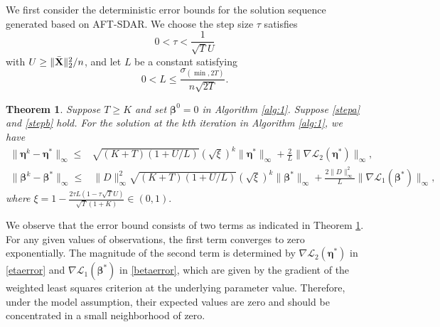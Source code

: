 \documentclass[12pt]{article}
\newtheorem{theorem}{Theorem}
\newcommand{\bX}{{\bf X}}
\newcommand{\bbeta}{\boldsymbol{\beta}}
\newcommand{\boldeta}{\boldsymbol{\eta}}
\begin{document}
We first consider the deterministic error bounds for the solution sequence generated
based on AFT-SDAR.
{ We choose  the step size $\tau$ satisfies}
 \begin{equation}
 \label{stepa}
 0 < \tau<\frac{1}{ \sqrt{T}U}
 \end{equation}
with $ U \ge {\|\bar{\bX}\|_2^2}/{n}$, and let $L$ be a constant satisfying
\begin{equation}
\label{stepb}
0<L\leq\frac{\sigma_{(\min,2T)}}{n\sqrt{2T}}.
\end{equation}
\begin{theorem}\label{th1}
Suppose $T \ge K$ and set $\bbeta^0=0$ in Algorithm \ref{alg:1}.
Suppose \eqref{stepa} and \eqref{stepb} hold.
For the solution at the $k$th iteration in Algorithm \ref{alg:1}, %
we have
{
\begin{align}
\label{etaerror}
\|\boldeta^k-\boldeta^*\|_{\infty}\leq& \sqrt{(K+T)(1+U/L)}(\sqrt{\xi})^k\|\boldeta^{*}\|_{\infty}+\frac{2}{L}\|\nabla \mathcal{L}_2(\boldeta^{*})\|_{\infty},
\end{align}
\begin{align}
\label{betaerror}
\|\bbeta^k-\bbeta^*\|_{\infty}\leq& \|D\|_{\infty}^2\sqrt{(K+T)(1+U/L)}(\sqrt{\xi})^k\|\bbeta^{*}\|_{\infty}
+\frac{2\|D\|_{\infty}^2}{L}\|\nabla {\mathcal L}_1(\bbeta^{*})\|_{\infty},
\end{align}
where $\xi=1-\frac{2\tau L(1-\tau \sqrt{T}U)}{ \sqrt{T}(1+K)}\in(0,1).$
}
\end{theorem}
We observe that the error bound consists of two terms as indicated in Theorem \ref{th1}. For any given values
of observations, the first term converges to
zero exponentially. The magnitude of the second term is determined by
$\nabla {\mathcal L}_2(\boldeta^{*})$ in
\eqref{etaerror}
and
$\nabla {\mathcal L}_1(\bbeta^{*})$ in \eqref{betaerror},
which are given by the gradient of the weighted least squares criterion at the underlying parameter value. Therefore, under the model assumption, their expected values are zero and should be concentrated in a small neighborhood of zero.
\end{document}
